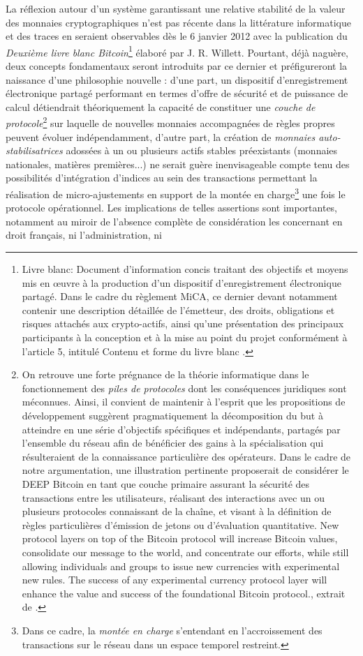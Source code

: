 {La réflexion autour d'un système garantissant une relative stabilité de la valeur des monnaies cryptographiques n'est pas récente dans la littérature informatique et des traces en seraient observables dès le 6 janvier 2012 avec la publication du \emph{Deuxième livre blanc Bitcoin}\footnote{\gls{Livre blanc}: Document d'information concis traitant des objectifs et moyens mis en \oe{}uvre à la production d'un dispositif d'enregistrement électronique partagé. Dans le cadre du règlement MiCA, ce dernier devant notamment contenir une description détaillée de l'émetteur, des droits, obligations et risques attachés aux crypto-actifs, ainsi qu'une présentation des principaux participants à la conception et à la mise au point du projet conformément à l'article 5, intitulé \og Contenu et forme du livre blanc \fg{}.} élaboré par J. R. Willett. Pourtant, déjà naguère, deux concepts fondamentaux seront introduits par ce dernier et préfigureront la naissance d'une philosophie nouvelle : d'une part, un dispositif d'enregistrement électronique partagé performant en termes d'offre de sécurité et de puissance de calcul détiendrait théoriquement la capacité de constituer une \emph{couche de protocole}\footnote{On retrouve une forte prégnance de la théorie informatique dans le fonctionnement des \emph{piles de protocoles} dont les conséquences juridiques sont méconnues. Ainsi, il convient de maintenir à l'esprit que les propositions de développement suggèrent pragmatiquement la décomposition du but à atteindre en une série d'objectifs spécifiques et indépendants, partagés par l'ensemble du réseau afin de bénéficier des gains à la spécialisation qui résulteraient de la connaissance particulière des opérateurs. Dans le cadre de notre argumentation, une illustration pertinente proposerait de considérer le DEEP Bitcoin en tant que couche primaire assurant la sécurité des transactions entre les utilisateurs, réalisant des interactions avec un ou plusieurs protocoles connaissant de la chaîne, et visant à la définition de règles particulières d'émission de jetons ou d'évaluation quantitative. \og New protocol layers on top of the Bitcoin protocol will increase Bitcoin values, consolidate our message to the world, and concentrate our efforts, while still allowing individuals and groups to issue new currencies with experimental new rules. The success of any experimental currency protocol layer will enhance the value and success of the foundational Bitcoin protocol.\fg{}, extrait de .} sur laquelle de nouvelles monnaies accompagnées de règles propres peuvent évoluer indépendamment, d'autre part, la création de \emph{monnaies auto-stabilisatrices} adossées à un ou plusieurs actifs stables préexistants (monnaies nationales, matières premières...) ne serait guère inenvisageable compte tenu des possibilités d'intégration d'indices au sein des transactions permettant la réalisation de micro-ajustements en support de la montée en charge\footnote{Dans ce cadre, la \emph{montée en charge} s'entendant en l'accroissement des transactions sur le réseau dans un espace temporel restreint.} une fois le protocole opérationnel. Les implications de telles assertions sont importantes, notamment au miroir de l'absence complète de considération les concernant en droit français, ni l'administration, ni }
